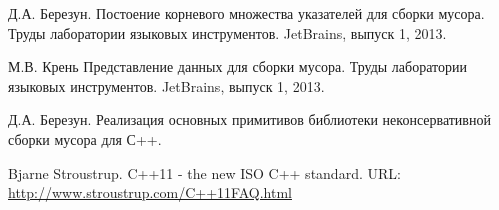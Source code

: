 
\begin{thebibliography}{}

Д.А. Березун.
Постоение корневого множества указателей для сборки мусора.
Труды лаборатории языковых инструментов.
JetBrains, выпуск 1, 2013.

М.В. Крень
Представление данных для сборки мусора.
Труды лаборатории языковых инструментов.
JetBrains, выпуск 1, 2013.


Д.А. Березун.
Реализация основных примитивов библиотеки неконсервативной сборки мусора для С++.


Bjarne Stroustrup. C++11 - the new ISO C++ standard.
URL: \url{http://www.stroustrup.com/C++11FAQ.html}


\end{thebibliography}
